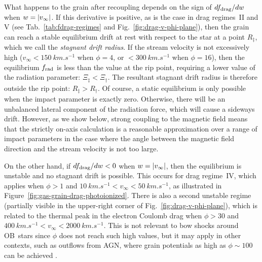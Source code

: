 What happens to the grain after recoupling depends on the sign of
\(d f_{\text{drag}} / d w\) when \(w = \lvert v_\infty\rvert\).  If this derivative is
positive, as is the case in drag regimes~II and V (see
Tab.~\ref{tab:fdrag-regimes} and Fig.~\ref{fig:drag-v-phi-plane}),
then the grain can reach a stable equilibrium drift at rest with
respect to the star at a point \(R_\ddag\), which we call the
\textit{stagnant drift radius}. If the stream velocity is not
excessively high (\(v_\infty < \SI{150}{km.s^{-1}}\) when
\(\phi = 4\), or \(< \SI{300}{km.s^{-1}}\) when \(\phi = 16\)), then the
equilibrium \(f_{\text{rad}}\) is less than the value at the rip point,
requiring a lower value of the radiation parameter:
\(\Xi_\ddag < \Xi_\dag\).  The resultant stagnant drift radius is therefore
outside the rip point: \(R_\ddag > R_\dag\).  Of course, a static equilibrium
is only possible when the impact parameter is exactly zero.
Otherwise, there will be an unbalanced lateral component of the
radiation force, which will cause a sideways drift.  However, as we
show below, strong coupling to the magnetic field means that the
strictly on-axis calculation is a reasonable approximation over a
range of impact parameters in the case where the angle between the
magnetic field direction and the stream velocity is not too large.

On the other hand, if \(d f_{\text{drag}} / d w < 0\) when
\(w = \lvert v_\infty\rvert\), then the equilibrium is unstable and no stagnant
drift is possible.  This occurs for drag regime~IV, which applies when
\(\phi > 1\) and
\(\SI{10}{km.s^{-1}} < v_\infty < \SI{50}{km.s^{-1}}\), as illustrated in
Figure~\ref{fig:gas-grain-drag-photoionized}.  There is also a second
unstable regime (partially visible in the upper-right corner of
Fig.~\ref{fig:drag-v-phi-plane}), which is related to the thermal peak
in the electron Coulomb drag when \(\phi > 30\) and
\(\SI{400}{km.s^{-1}} < v_\infty < \SI{2000}{km.s^{-1}}\).  This is not
relevant to bow shocks around OB~stars since \(\phi\) does not reach such
high values, but it may apply in other contexts, such as outflows from
AGN, where grain potentials as high as \(\phi \sim 100\) can be achieved
\citep{Weingartner:2006a}.

